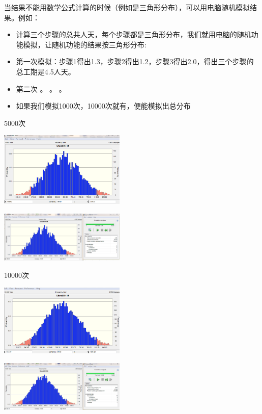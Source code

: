 当结果不能用数学公式计算的时候（例如是三角形分布），可以用电脑随机模拟结果。例如：

\begin{itemize}
\tightlist
\item
  计算三个步骤的总共人天，每个步骤都是三角形分布，我们就用电脑的随机功能模拟，让随机功能的结果按三角形分布:
\item
  第一次模拟：步骤1得出1.3，步骤2得出1.2，步骤3得出2.0，得出三个步骤的总工期是4.5人天。
\item
  第二次 。 。 。
\item
  如果我们模拟1000次，10000次就有，便能模拟出总分布
\end{itemize}

5000次



\includegraphics[width=6cm]{捕获21.PNG}

\includegraphics[width=6cm]{捕获2.PNG}


10000次



\includegraphics[width=6cm]{捕获11.PNG}

\includegraphics[width=6cm]{捕获1.PNG}






